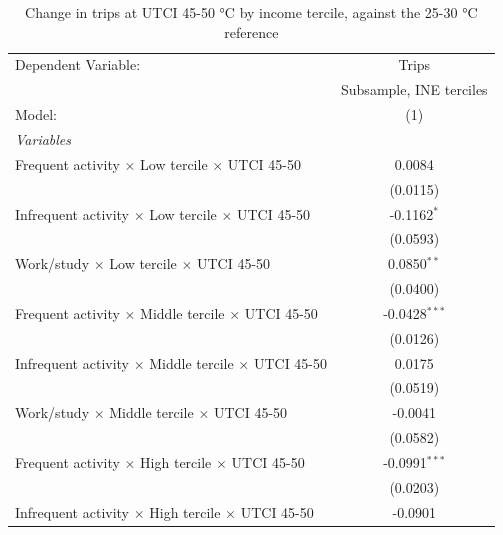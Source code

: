 
\begin{table}[htbp]
   \caption{\label{table_model_d_45-50} Change in trips at UTCI 45-50 °C by income tercile, against the 25-30 °C reference}
   \centering
   \small
   \begin{tabular}{lc}
      \tabularnewline \midrule \midrule
      Dependent Variable:                                               & Trips\\  
                                                                        & Subsample, INE terciles \\   
      Model:                                                            & (1)\\  
      \midrule
      \emph{Variables}\\
      Frequent activity $\times$ Low tercile $\times$ UTCI 45-50        & 0.0084\\   
                                                                        & (0.0115)\\   
      Infrequent activity $\times$ Low tercile $\times$ UTCI 45-50      & -0.1162$^{*}$\\   
                                                                        & (0.0593)\\   
      Work/study $\times$ Low tercile $\times$ UTCI 45-50               & 0.0850$^{**}$\\   
                                                                        & (0.0400)\\   
      Frequent activity $\times$ Middle tercile $\times$ UTCI 45-50     & -0.0428$^{***}$\\   
                                                                        & (0.0126)\\   
      Infrequent activity $\times$ Middle tercile $\times$ UTCI 45-50   & 0.0175\\   
                                                                        & (0.0519)\\   
      Work/study $\times$ Middle tercile $\times$ UTCI 45-50            & -0.0041\\   
                                                                        & (0.0582)\\   
      Frequent activity $\times$ High tercile $\times$ UTCI 45-50       & -0.0991$^{***}$\\   
                                                                        & (0.0203)\\   
      Infrequent activity $\times$ High tercile $\times$ UTCI 45-50     & -0.0901\\   

\end{tabular}
\end{table}
